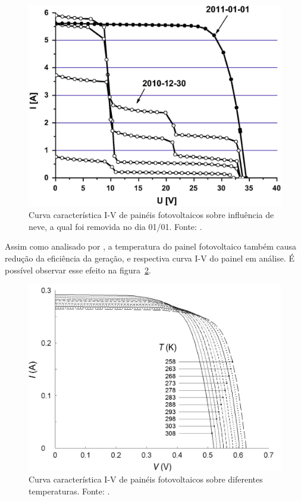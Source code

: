 \FloatBarrier
\begin{figure}[!htbp]
	\centering
	\includegraphics[scale=1.25]{imagens/IxV_schill}
	\caption{Curva característica I-V de painéis fotovoltaicos sobre influência de neve, a qual foi removida no dia 01/01. Fonte: . }

	\label{fig:CurvaIVNeve}
\end{figure}
\FloatBarrier


Assim como analisado por  , a temperatura do painel fotovoltaico também causa redução da eficiência da geração, e respectiva curva I-V do painel em análise. É possível observar esse efeito na figura~\ref{fig:IVTemp}.

\FloatBarrier
\begin{figure}[!htbp]
	\centering
	\includegraphics[scale=0.3]{imagens/IxV_Temp}
	\caption{Curva característica I-V de painéis fotovoltaicos sobre diferentes temperaturas. Fonte: . }
	
	\label{fig:IVTemp}
\end{figure}
\FloatBarrier

